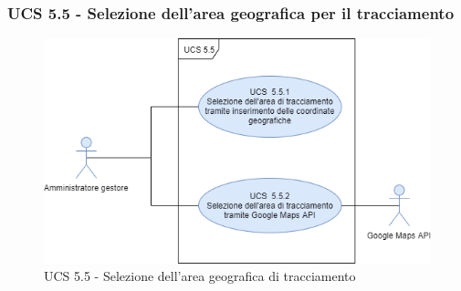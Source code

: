 \subsubsection{UCS 5.5 - Selezione dell'area geografica per il tracciamento}%
\begin{figure}[h]
	\centering
    \includegraphics[scale=0.53]{sezioni/UseCase/Immagini/UCS5.5.png}
    \caption{UCS 5.5 - Selezione dell'area geografica di tracciamento}
\end{figure}
